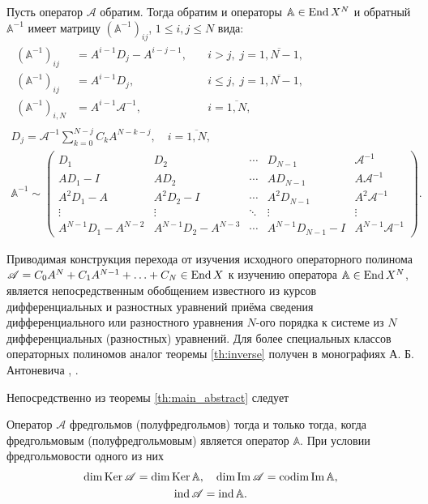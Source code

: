 \begin{theorem}\label{th:inverse}
    Пусть оператор $\mathcal A$ обратим. Тогда обратим и операторы $\mathbb A \in \operatorname{End} X^N$ и обратный $\mathbb A^{-1}$ имеет матрицу $(\mathbb A^{-1})_{ij}$, $1 \leq i, j \leq N$ вида:
    \begin{gather*}
        \begin{aligned}
        (\mathbb A^{-1})_{ij} &= A^{i-1} D_j - A^{i-j-1}, &\quad i > j, \; j = \overline{1,N-1}, \\
        (\mathbb A^{-1})_{ij} &= A^{i-1} D_j, &\quad i \leq j, \; j = \overline{1,N-1}, \\
        (\mathbb A^{-1})_{i,N} &= A^{i-1} \mathcal A^{-1}, &\quad i = \overline{1,N},
        \end{aligned}\\
        D_j = \mathcal A^{-1} \sum_{k = 0}^{N-j} C_k A^{N-k-j}, \quad i = \overline{1,N},\\[0.5em]
        \mathbb A^{-1} \sim \begin{pmatrix}
          D_1 &  D_2 &  \cdots & D_{N-1} &  \mathcal A^{-1} \\
          A D_1 - I & A D_2 & \cdots & A D_{N-1} & A  \mathcal A^{-1} \\
          A^2 D_1 - A & A^2 D_2 - I & \cdots & A^2 D_{N-1} & A^2 \mathcal A^{-1} \\
          \vdots & \vdots & \ddots & \vdots & \vdots \\
          A^{N-1} D_1 - A^{N-2} & A^{N-1} D_2 - A^{N-3} & \cdots & A^{N-1} D_{N-1} - I & A^{N-1}  \mathcal A^{-1}
       \end{pmatrix}.
    \end{gather*}
\end{theorem}

Приводимая конструкция перехода от изучения исходного операторного полинома $\mathcal A = C_0 A^N + C_1 A^{N - 1} + \dotsc + C_N \in \operatorname{End} X$ к изучению оператора $\mathbb A \in \operatorname{End} X^N$, является непосредственным обобщением известного из курсов дифференциальных и разностных уравнений приёма сведения дифференциального или разностного уравнения $N$-ого порядка к системе из $N$ дифференциальных (разностных) уравнений. Для более специальных классов операторных полиномов аналог теоремы \ref{th:inverse} получен в монографиях А. Б. Антоневича \cite[теорема 9.1]{antonevich2}, \cite{antonevich}.

Непосредственно из теоремы \ref{th:main_abstract} следует
\begin{theorem}\label{th:abstract_fredholm}
    Оператор $\mathcal A$ фредгольмов (полуфредгольмов) тогда и только тогда, когда фредгольмовым (полуфредгольмовым) является оператор $\mathbb A$. При условии фредгольмовости одного из них
    \begin{gather*}
    \dim \operatorname{Ker} \mathcal A = \dim \operatorname{Ker} \mathbb A, \quad \dim \operatorname{Im} \mathcal A = \operatorname{codim} \operatorname{Im} \mathbb A, \\
    \operatorname{ind} \mathcal A = \operatorname{ind} \mathbb A.
    \end{gather*}
\end{theorem}

